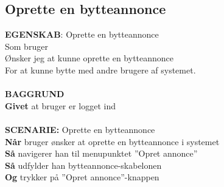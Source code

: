 \subsection{Oprette en bytteannonce}
{\color{blue}\textbf{EGENSKAB}:} Oprette en bytteannonce \\
Som bruger \\
Ønsker jeg at kunne oprette en bytteannonce \\
For at kunne bytte med andre brugere af systemet.\\ \\
{\color{blue}\textbf{BAGGRUND}} \\
{\color{blue}\textbf{Givet}} at bruger er logget ind \\ \\
{\color{blue}\textbf{SCENARIE:}} Oprette en bytteannonce \\
{\color{blue}\textbf{Når}}  bruger ønsker at oprette en bytteannonce i systemet \\
{\color{blue}\textbf{Så}} navigerer han til menupunktet ”Opret annonce” \\
{\color{blue}\textbf{Så}} udfylder han bytteannonce-skabelonen \\
{\color{blue}\textbf{Og}} trykker på ”Opret annonce”-knappen